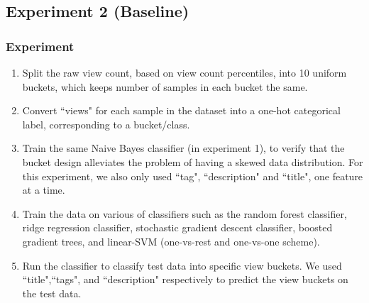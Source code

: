 \documentclass[english]{article}
\begin{document}
\subsection{Experiment 2 (Baseline)}
\subsubsection{Experiment}
\label{Bucket Redesign}
\begin{enumerate}
\item Split the raw view count, based on view count percentiles, into 10 uniform buckets, which keeps number of samples in each bucket the same. 
\item Convert ``views" for each sample in the dataset into a one-hot categorical label, corresponding to a bucket/class.
\item Train the same Naive Bayes classifier (in experiment 1), to verify that the bucket design alleviates the problem of having a skewed data distribution. For this experiment, we also only used ``tag", ``description" and ``title", one feature at a time.
\item Train the data on various of classifiers such as the random forest classifier, ridge regression classifier, stochastic gradient descent classifier, boosted gradient trees, and linear-SVM (one-vs-rest and one-vs-one scheme).
\item Run the classifier to classify test data into specific view buckets. We used ``title",``tags", and ``description" respectively to predict the view buckets on the test data.
\end{enumerate}
\end{document}
